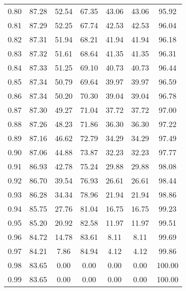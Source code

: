 \begin{tabular}{|c|c|c|c|c|c|c|}
      0.80 &     87.28 &     52.54 &      67.35 &   43.06 &      43.06 &         95.92 \\
      0.81 &     87.29 &     52.25 &      67.74 &   42.53 &      42.53 &         96.04 \\
      0.82 &     87.31 &     51.94 &      68.21 &   41.94 &      41.94 &         96.18 \\
      0.83 &     87.32 &     51.61 &      68.64 &   41.35 &      41.35 &         96.31 \\
      0.84 &     87.33 &     51.25 &      69.10 &   40.73 &      40.73 &         96.44 \\
      0.85 &     87.34 &     50.79 &      69.64 &   39.97 &      39.97 &         96.59 \\
      0.86 &     87.34 &     50.20 &      70.30 &   39.04 &      39.04 &         96.78 \\
      0.87 &     87.30 &     49.27 &      71.04 &   37.72 &      37.72 &         97.00 \\
      0.88 &     87.26 &     48.23 &      71.86 &   36.30 &      36.30 &         97.22 \\
      0.89 &     87.16 &     46.62 &      72.79 &   34.29 &      34.29 &         97.49 \\
      0.90 &     87.06 &     44.88 &      73.87 &   32.23 &      32.23 &         97.77 \\
      0.91 &     86.93 &     42.78 &      75.24 &   29.88 &      29.88 &         98.08 \\
      0.92 &     86.70 &     39.54 &      76.93 &   26.61 &      26.61 &         98.44 \\
      0.93 &     86.28 &     34.34 &      78.96 &   21.94 &      21.94 &         98.86 \\
      0.94 &     85.75 &     27.76 &      81.04 &   16.75 &      16.75 &         99.23 \\
      0.95 &     85.20 &     20.92 &      82.58 &   11.97 &      11.97 &         99.51 \\
      0.96 &     84.72 &     14.78 &      83.61 &    8.11 &       8.11 &         99.69 \\
      0.97 &     84.21 &      7.86 &      84.94 &    4.12 &       4.12 &         99.86 \\
      0.98 &     83.65 &      0.00 &       0.00 &    0.00 &       0.00 &        100.00 \\
      0.99 &     83.65 &      0.00 &       0.00 &    0.00 &       0.00 &        100.00 \\
\bottomrule
\end{tabular}
